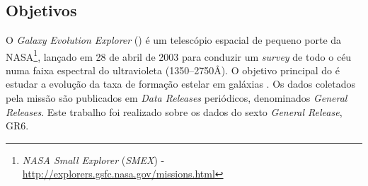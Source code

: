 


\chapter{\galex}
\label{sec:Galex}



\section{Objetivos}
\label{sec:Galex:Objetivos}

O {\em Galaxy Evolution Explorer} (\galex) é um telescópio espacial de pequeno
porte da NASA\footnote{{\em NASA Small Explorer} ({\em SMEX}) -
\url{http://explorers.gsfc.nasa.gov/missions.html}}, lançado em 28 de abril de
2003 para conduzir um {\em survey} de todo o céu numa faixa espectral do
ultravioleta (1350--2750\AA). O objetivo principal do \galex é estudar a
evolução da taxa de formação estelar em galáxias \citep{Martin2005}. Os dados
coletados pela missão são publicados em {\em Data Releases} periódicos,
denominados {\em General Releases}. Este trabalho foi realizado sobre os dados
do sexto {\em General Release}, GR6.

